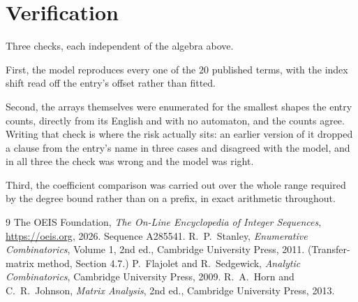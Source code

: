 \documentclass[11pt,a4paper]{article}
\theoremstyle{plain}
\theoremstyle{definition}
\begin{document}
\section{Verification}

Three checks, each independent of the algebra above.

First, the model reproduces every one of the $20$ published terms, with the index shift
read off the entry's offset rather than fitted.

Second, the arrays themselves were enumerated for the smallest shapes the entry counts,
directly from its English and with no automaton, and the counts agree. Writing that check is
where the risk actually sits: an earlier version of it dropped a clause from the entry's name
in three cases and disagreed with the model, and in all three the check was wrong and the model
was right.

Third, the coefficient comparison was carried out over the whole range required by the degree
bound rather than on a prefix, in exact arithmetic throughout.

\begin{thebibliography}{9}
 The OEIS Foundation, \emph{The On-Line Encyclopedia of Integer
Sequences}, \url{https://oeis.org}, 2026. Sequence A285541.
 R.~P.~Stanley, \emph{Enumerative Combinatorics}, Volume 1, 2nd ed.,
Cambridge University Press, 2011. (Transfer-matrix method, Section 4.7.)
 P.~Flajolet and R.~Sedgewick, \emph{Analytic Combinatorics}, Cambridge
University Press, 2009.
 R.~A.~Horn and C.~R.~Johnson, \emph{Matrix Analysis}, 2nd ed., Cambridge
University Press, 2013.
\end{thebibliography}
\end{document}
